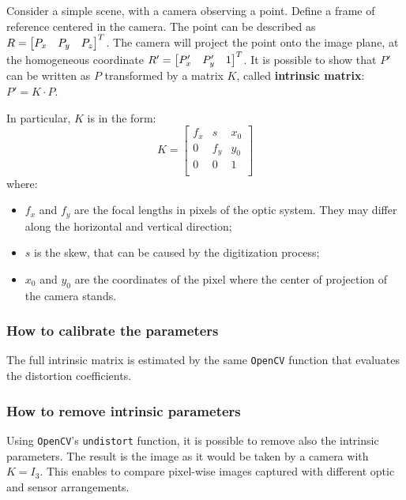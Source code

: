 Consider a simple scene, with a camera observing a point.
Define a frame of reference centered in the camera.
The point can be described as $R=\begin{bmatrix} P_x & P_y & P_z \end{bmatrix}^T$.
The camera will project the point onto the image plane, at the homogeneous coordinate $R'=\begin{bmatrix} P_x' & P_y' & 1 \end{bmatrix}^T$.
It is possible to show that $P'$ can be written as $P$ transformed by a matrix $K$, called \textbf{intrinsic matrix}: $P' = K{\cdot}P$.

In particular, $K$ is in the form:
\begin{equation}
	K = \begin{bmatrix}
		f_x & s   & x_0 \\
		0   & f_y & y_0 \\
		0   & 0   & 1   \\
	\end{bmatrix}
\end{equation}
where:
\begin{itemize}
	\itemsep 0em
	\item $f_x$ and $f_y$ are the focal lengths in pixels of the optic system. They may differ along the horizontal and vertical direction;
	\item $s$ is the skew, that can be caused by the digitization process;
	\item $x_0$ and $y_0$ are the coordinates of the pixel where the center of projection of the camera stands.
\end{itemize}

\subsubsection{How to calibrate the parameters}

The full intrinsic matrix is estimated by the same \texttt{OpenCV} function that evaluates the distortion coefficients.

\subsubsection{How to remove intrinsic parameters}
Using \texttt{OpenCV}'s \texttt{undistort} function, it is possible to remove also the intrinsic parameters.
The result is the image as it would be taken by a camera with $K{=}I_3$.
This enables to compare pixel-wise images captured with different optic and sensor arrangements.


